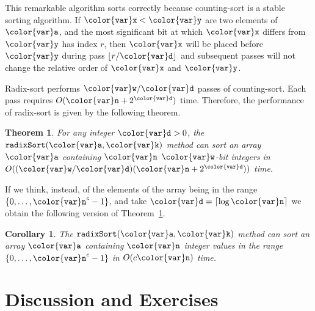 \documentclass[10pt]{book}
\theoremstyle{plain}
\newtheorem{thm}{Theorem}[chapter]
\newcommand{\thmlabel}[1]{\label{thm:#1}}
\newcommand{\thmref}[1]{Theorem~\ref{thm:#1}}
\newtheorem{cor}{Corollary}[chapter]
\newcommand{\corlabel}[1]{\label{cor:#1}}
\theoremstyle{definition}
\begin{document}
This remarkable algorithm sorts correctly because counting-sort is
a stable sorting algorithm.  If $\ensuremath{\mathtt{{\color{var}x}}} < \ensuremath{\mathtt{{\color{var}y}}}$ are two elements of \ensuremath{\mathtt{{\color{var}a}}},
and the most significant bit at which \ensuremath{\mathtt{{\color{var}x}}} differs from \ensuremath{\mathtt{{\color{var}y}}} has index $r$,
then \ensuremath{\mathtt{{\color{var}x}}} will be placed before \ensuremath{\mathtt{{\color{var}y}}} during pass $\lfloor r/\ensuremath{\mathtt{{\color{var}d}}}\rfloor$
and subsequent passes will not change the relative order of \ensuremath{\mathtt{{\color{var}x}}} and \ensuremath{\mathtt{{\color{var}y}}}.

Radix-sort performs \ensuremath{\mathtt{{\color{var}w}/{\color{var}d}}} passes of counting-sort.  Each pass requires
$O(\ensuremath{\mathtt{{\color{var}n}}}+2^{\ensuremath{\mathtt{{\color{var}d}}}})$ time. Therefore, the performance of radix-sort is given
by the following theorem.
\begin{thm}\thmlabel{radix-sort}
  For any integer $\ensuremath{\mathtt{{\color{var}d}}}>0$, the \ensuremath{\mathtt{radixSort({\color{var}a},{\color{var}k})}} method can sort an array
  \ensuremath{\mathtt{{\color{var}a}}} containing \ensuremath{\mathtt{{\color{var}n}}} \ensuremath{\mathtt{{\color{var}w}}}-bit integers in $O((\ensuremath{\mathtt{{\color{var}w}}}/\ensuremath{\mathtt{{\color{var}d}}})(\ensuremath{\mathtt{{\color{var}n}}}+2^{\ensuremath{\mathtt{{\color{var}d}}}}))$ time.
\end{thm}

If we think, instead, of the elements of the array being in the range
$\{0,\ldots,\ensuremath{\mathtt{{\color{var}n}}}^c-1\}$, and take $\ensuremath{\mathtt{{\color{var}d}}}=\lceil\log\ensuremath{\mathtt{{\color{var}n}}}\rceil$ we obtain
the following version of \thmref{radix-sort}.
\begin{cor}\corlabel{radix-sort-poly}
  The \ensuremath{\mathtt{radixSort({\color{var}a},{\color{var}k})}} method can sort an array \ensuremath{\mathtt{{\color{var}a}}} containing \ensuremath{\mathtt{{\color{var}n}}}
  integer values in the range $\{0,\ldots,\ensuremath{\mathtt{{\color{var}n}}}^c-1\}$ in $O(c\ensuremath{\mathtt{{\color{var}n}}})$ time.
\end{cor}

\section{Discussion and Exercises}
\end{document}
